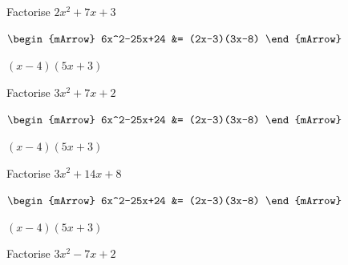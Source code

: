 \clearpage\noindent%
\begin{mtask}
   \task \begin{exercise} Factorise $2x^2+7x+3$\\
             \begin{envSolution}
			      
			      $\begin{mArrow}
			        6x^2-25x+24  &= (2x-3)(3x-8)                       
				 \end{mArrow}$
                 \begin{shortsolution}  
				       $(x-4)(5x+3) $
			     \end{shortsolution}				 
               \end{envSolution}
         \end{exercise}
		 
   \task \begin{exercise} Factorise $3x^2+7x+2$\\
             \begin{envSolution}
			      
			      $\begin{mArrow}
			        6x^2-25x+24  &= (2x-3)(3x-8)                       
				 \end{mArrow}$
                 \begin{shortsolution}  
				       $(x-4)(5x+3) $
			     \end{shortsolution}				 
               \end{envSolution}
         \end{exercise}

   \task \begin{exercise} Factorise $3x^2+14x+8$\\
             \begin{envSolution}
			      $\begin{mArrow}
			        6x^2-25x+24  &= (2x-3)(3x-8)                       
				 \end{mArrow}$
                 \begin{shortsolution}  
				       $(x-4)(5x+3) $
			     \end{shortsolution}				 
               \end{envSolution}
         \end{exercise}
		 		 
   \task \begin{exercise} Factorise $3x^2-7x+2$\\
             \begin{envSolution}
			      

\end{envSolution}
\end{exercise}
\end{mtask}
